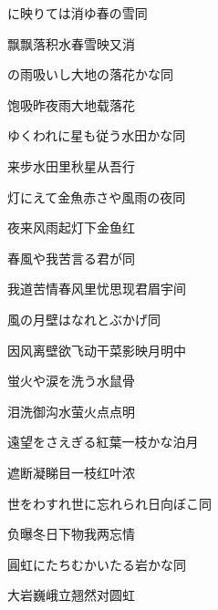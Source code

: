 \begin{haiku}
    {\FH {}に映りては消ゆ春の雪}\hfill{\FH 同}

    {\FK 飘飘落积水春雪映又消}
\end{haiku}

\begin{haiku}
    {\FH {}の雨吸いし大地の落花かな}\hfill{\FH 同}

    {\FK 饱吸昨夜雨大地载落花}
\end{haiku}

\begin{haiku}
    {\FH ゆくわれに星も従う水田かな}\hfill{\FH 同}

    {\FK 来步水田里秋星从吾行}
\end{haiku}

\begin{haiku}
    {\FH 灯にえて金魚赤さや風雨の夜}\hfill{\FH 同}

    {\FK 夜来风雨起灯下金鱼红}
\end{haiku}

\begin{haiku}
    {\FH 春風や我苦言る君が}\hfill{\FH 同}

    {\FK 我道苦情春风里忧思现君眉宇间}
\end{haiku}

\begin{haiku}
    {\FH 風の月壁はなれとぶかげ}\hfill{\FH 同}

    {\FK 因风离壁欲飞动干菜影映月明中}
\end{haiku}

\begin{haiku}
    {\FH 蛍火や涙を洗う水}\hfill{\FH 鼠骨}

    {\FK 泪洗御沟水萤火点点明}
\end{haiku}

\begin{haiku}
    {\FH 遠望をさえぎる紅葉一枝かな}\hfill{\FH 泊月}

    {\FK 遮断凝睇目一枝红叶浓}
\end{haiku}

\begin{haiku}
    {\FH 世をわすれ世に忘れられ日向ぼこ}\hfill{\FH 同}

    {\FK 负曝冬日下物我两忘情}
\end{haiku}

\begin{haiku}
    {\FH 圓虹にたちむかいたる岩かな}\hfill{\FH 同}

    {\FK 大岩巍峨立翘然对圆虹}
\end{haiku}

